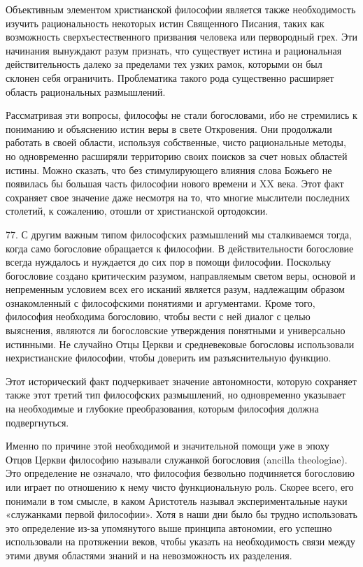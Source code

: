 \documentclass[a5paper,10pt]{article}
\begin{document}
Объективным элементом христианской философии является также необходимость
изучить рациональность некоторых истин Священного Писания, таких как
возможность сверхъестественного призвания человека или первородный грех. Эти
начинания вынуждают разум признать, что существует истина и рациональная
действительность далеко за пределами тех узких рамок, которыми он был склонен
себя ограничить. Проблематика такого рода существенно расширяет область
рациональных размышлений.

Рассматривая эти вопросы, философы не стали богословами, ибо не стремились к
пониманию и объяснению истин веры в свете Откровения. Они продолжали работать в
своей области, используя собственные, чисто рациональные методы, но
одновременно расширяли территорию своих поисков за счет новых областей истины.
Можно сказать, что без стимулирующего влияния слова Божьего не появилась бы
большая часть философии нового времени и XX века. Этот факт сохраняет свое
значение даже несмотря на то, что многие мыслители последних столетий, к
сожалению, отошли от христианской ортодоксии.

77. С другим важным типом философских размышлений мы сталкиваемся тогда, когда
само богословие обращается к философии. В действительности богословие всегда
нуждалось и нуждается до сих пор в помощи философии. Поскольку богословие
создано критическим разумом, направляемым светом веры, основой и непременным
условием всех его исканий является разум, надлежащим образом ознакомленный с
философскими понятиями и аргументами. Кроме того, философия необходима
богословию, чтобы вести с ней диалог с целью выяснения, являются ли
богословские утверждения понятными и универсально истинными. Не случайно Отцы
Церкви и средневековые богословы использовали нехристианские философии, чтобы
доверить им разъяснительную функцию.

Этот исторический факт подчеркивает значение автономности, которую сохраняет
также этот третий тип философских размышлений, но одновременно указывает на
необходимые и глубокие преобразования, которым философия должна подвергнуться.

Именно по причине этой необходимой и значительной помощи уже в эпоху Отцов
Церкви философию называли служанкой богословия (ancilla theologiae). Это
определение не означало, что философия безвольно подчиняется богословию или
играет по отношению к нему чисто функциональную роль. Скорее всего, его
понимали в том смысле, в каком Аристотель называл экспериментальные науки
«служанками первой философии». Хотя в наши дни было бы трудно использовать это
определение из-за упомянутого выше принципа автономии, его успешно использовали
на протяжении веков, чтобы указать на необходимость связи между этими двумя
областями знаний и на невозможность их разделения.
\end{document}
